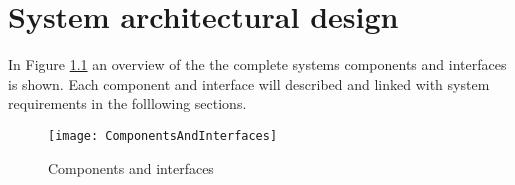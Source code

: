 \documentclass[Main]{subfiles}
\begin{document}
\chapter{System architectural design}
In Figure \ref{fig:ComponentsAndInterfaces} an overview of the the complete systems components and interfaces is shown. Each component and interface will described and linked with system requirements in the folllowing sections.

\begin{figure}[H]
\centering
\texttt{[image: ComponentsAndInterfaces]}
\caption{Components and interfaces}
\label{fig:ComponentsAndInterfaces}
\end{figure}





\end{document}
